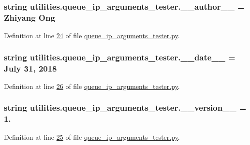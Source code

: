 \subsubsection[{\+\_\+\+\_\+author\+\_\+\+\_\+}]{\setlength{\rightskip}{0pt plus 5cm}string utilities.\+queue\+\_\+ip\+\_\+arguments\+\_\+tester.\+\_\+\+\_\+author\+\_\+\+\_\+ = \textquotesingle{}Zhiyang Ong\textquotesingle{}}\label{namespaceutilities_1_1queue__ip__arguments__tester_a4613e6fdf0e66646ab9e6b2431f60697}


Definition at line \hyperlink{queue__ip__arguments__tester_8py_source_l00024}{24} of file \hyperlink{queue__ip__arguments__tester_8py_source}{queue\+\_\+ip\+\_\+arguments\+\_\+tester.\+py}.

\hypertarget{namespaceutilities_1_1queue__ip__arguments__tester_abb3d4e36e816d047434e26922c0e28fe}{}
\subsubsection[{\+\_\+\+\_\+date\+\_\+\+\_\+}]{\setlength{\rightskip}{0pt plus 5cm}string utilities.\+queue\+\_\+ip\+\_\+arguments\+\_\+tester.\+\_\+\+\_\+date\+\_\+\+\_\+ = \textquotesingle{}July 31, 2018\textquotesingle{}}\label{namespaceutilities_1_1queue__ip__arguments__tester_abb3d4e36e816d047434e26922c0e28fe}


Definition at line \hyperlink{queue__ip__arguments__tester_8py_source_l00026}{26} of file \hyperlink{queue__ip__arguments__tester_8py_source}{queue\+\_\+ip\+\_\+arguments\+\_\+tester.\+py}.

\hypertarget{namespaceutilities_1_1queue__ip__arguments__tester_a37d1fc5c2ed863dec0b8ce969bc4ac4c}{}
\subsubsection[{\+\_\+\+\_\+version\+\_\+\+\_\+}]{\setlength{\rightskip}{0pt plus 5cm}string utilities.\+queue\+\_\+ip\+\_\+arguments\+\_\+tester.\+\_\+\+\_\+version\+\_\+\+\_\+ = \textquotesingle{}1.\textquotesingle{}}\label{namespaceutilities_1_1queue__ip__arguments__tester_a37d1fc5c2ed863dec0b8ce969bc4ac4c}


Definition at line \hyperlink{queue__ip__arguments__tester_8py_source_l00025}{25} of file \hyperlink{queue__ip__arguments__tester_8py_source}{queue\+\_\+ip\+\_\+arguments\+\_\+tester.\+py}.

